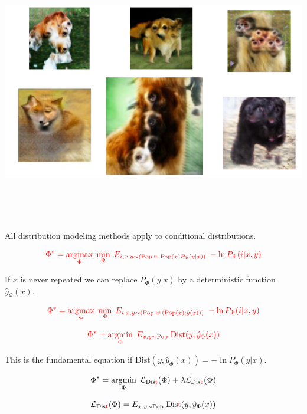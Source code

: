 {

\centerline{\includegraphics[height = 4.5in]{../images/BadGAN}}



All distribution modeling methods apply to conditional distributions.

$${\color{red} \Phi^* = \operatorname*{argmax}_\Phi \; \min_\Psi \;E_{i,x,y \sim (\mathrm{Pop}\; \uplus \;\mathrm{Pop}(x)P_\Phi(y|x))}\;-\ln P_\Psi(i|x,y)}$$

If $x$ is never repeated we can replace $P_\Phi(y|x)$ by a deterministic function $\hat{y}_\Phi(x)$.


$${\color{red} \Phi^* = \operatorname*{argmax}_\Phi \; \min_\Psi \;E_{i,x,y \sim (\mathrm{Pop}\; \uplus \;(\mathrm{Pop}(x);\hat{y}(x)))}\;-\ln P_\Psi(i|x,y)}$$



$${\color{red} \Phi^* = \operatorname*{argmin}_\Phi\; E_{x,y \sim \mathrm{Pop}}\;\mathrm{Dist}(y,\hat{y}_\Phi(x))}$$

This is the fundamental equation if {\color{red} $\mathrm{Dist}(y,\hat{y}_\Phi(x)) = -\ln P_\Phi(y|x)$}.

\vfill
$$\Phi^* = \operatorname*{argmin}_\Phi\;{\cal L}_{\mathrm{Dis{\color{red}t}}}(\Phi) + \lambda{\cal L}_{\mathrm{Dis{\color{red}c}}}(\Phi)$$

$${\cal L}_{\mathrm{Dis{\color{red}t}}}(\Phi) =  E_{x,y \sim \mathrm{Pop}}\;\mathrm{Dis{\color{red}t}}(y,\hat{y}_{\Phi}(x))$$

}
